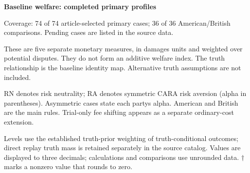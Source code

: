 \documentclass[10pt]{article}
\begin{document}
{\LARGE\bfseries Baseline welfare: completed primary profiles}\par\medskip
Coverage: 74 of 74 article-selected primary cases; 36 of 36 American/British comparisons. Pending cases are listed in the source data.\par\smallskip
These are five separate monetary measures, in damages units and weighted over potential disputes. They do not form an additive welfare index. The truth relationship is the baseline identity map. Alternative truth assumptions are not included.\par\smallskip
RN denotes risk neutrality; RA denotes symmetric CARA risk aversion (alpha in parentheses). Asymmetric cases state each party\textquotesingle s alpha. American and British are the main rules. Trial-only fee shifting appears as a separate ordinary-cost extension.\par\smallskip
Levels use the established truth-prior weighting of truth-conditional outcomes; direct replay truth mass is retained separately in the source catalog. Values are displayed to three decimals; calculations and comparisons use unrounded data. $\dagger$ marks a nonzero value that rounds to zero.\par\medskip
\end{document}
